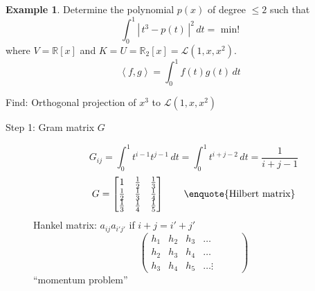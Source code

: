 \documentclass[a4paper,landscape,twocolumn]{article}
\newcommand\abs[1]{|\,#1\,|}
\newcommand\functional[1]{\left\langle{#1}\right\rangle}
\theoremstyle{definition}
\newtheorem{ex}{Example}
\begin{document}
\begin{ex}
  \label{bsp-8.55}
  Determine the polynomial $p(x)$ of degree $\leq 2$ such that
  \[ \int_0^1 \abs{t^3 - p(t)}^2 \, dt = \text{ min!} \]
  where $V = \mathbb R[x]$ and $K = U = \mathbb R_2[x] = \mathcal{L}(1, x, x^2)$.
  \[ \functional{f,g} = \int_0^1 f(t) g(t) \, dt \]

  Find: Orthogonal projection of $x^3$ to $\mathcal L(1, x, x^2)$

  \begin{description}
    \item[Step 1: Gram matrix $G$]
      \[
        G_{ij}
        = \int_0^1 t^{i-1} t^{j-1} \, dt
        = \int_0^1 t^{i+j-2} \, dt
        = \frac{1}{i + j - 1}
      \] \[
        G = \begin{bmatrix}
          1 & \frac12 & \frac13 \\
          \frac12 & \frac13 & \frac14 \\
          \frac13 & \frac14 & \frac15
        \end{bmatrix}
        \qquad \text{\enquote{Hilbert matrix}}
      \]
      Hankel matrix:
        $a_{ij}  a_{i'j'}$ if $i + j = i' + j'$
      \[
        \begin{pmatrix}
          h_1 & h_2 & h_3 & \ldots \\
          h_2 & h_3 & h_4 & \ldots \\
          h_3 & h_4 & h_5 & \ldots
          \vdots & & &
        \end{pmatrix}
      \]
      \enquote{momentum problem}  %


\end{description}
\end{ex}
\end{document}
